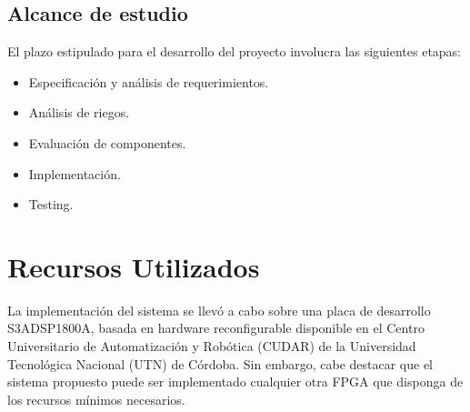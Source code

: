 %

\subsection{Alcance de estudio}

El plazo estipulado para el desarrollo del proyecto involucra las siguientes etapas:

\begin{itemize}
\item Especificación y análisis de requerimientos.
\item Análisis de riegos.
\item Evaluación de componentes.
\item Implementación.
\item Testing.
\end{itemize}

\section{Recursos Utilizados}

La implementación del sistema se llevó a cabo sobre una placa de
desarrollo S3ADSP1800A, basada en hardware reconfigurable disponible en
el Centro Universitario de Automatización y Robótica (CUDAR) de la
Universidad Tecnológica Nacional (UTN) de Córdoba. Sin embargo, cabe
destacar que el sistema propuesto puede ser implementado cualquier
otra FPGA que disponga de los recursos mínimos necesarios.



